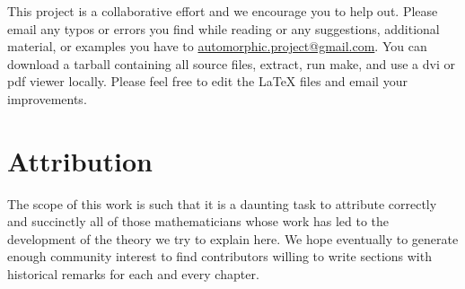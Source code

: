 \documentclass{stacks-project-book}
\theoremstyle{plain}
\theoremstyle{definition}
\theoremstyle{remark}
\numberwithin{equation}{subsection}
\begin{document}
\medskip\noindent
This project is a collaborative effort and we encourage you to help out.
Please email any typos or errors you find while reading or
any suggestions, additional material, or examples you have to
\href{mailto:automorphic.project@gmail.com}{automorphic.project@gmail.com}.
You can download a tarball containing all source files, extract,
run make, and use a dvi or pdf viewer locally. Please feel free to
edit the LaTeX files and email your improvements.


\section{Attribution}
\label{introduction-section-attribution}

\noindent
The scope of this work is such that it is a daunting task to attribute
correctly and succinctly all of those mathematicians whose work has led
to the development of the theory we try to explain here. We hope eventually
to generate enough community interest to find contributors willing to write
sections with historical remarks for each and every chapter.
\end{document}
